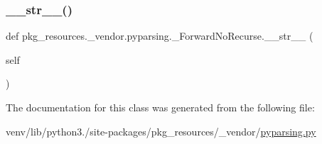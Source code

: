 \subsubsection{\texorpdfstring{\+\_\+\+\_\+str\+\_\+\+\_\+()}{\_\_str\_\_()}}
{\footnotesize\ttfamily def pkg\+\_\+resources.\+\_\+vendor.\+pyparsing.\+\_\+\+Forward\+No\+Recurse.\+\_\+\+\_\+str\+\_\+\+\_\+ (\begin{DoxyParamCaption}\item[{}]{self }\end{DoxyParamCaption})}



The documentation for this class was generated from the following file\+:\begin{DoxyCompactItemize}
\item 
venv/lib/python3./site-\/packages/pkg\+\_\+resources/\+\_\+vendor/\hyperlink{pkg__resources_2__vendor_2pyparsing_8py}{pyparsing.\+py}\end{DoxyCompactItemize}
